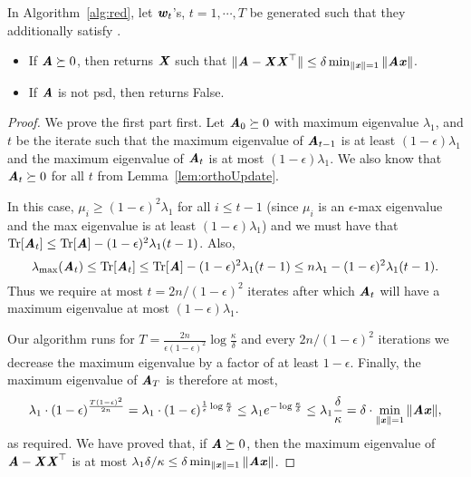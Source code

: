 \begin{lemma}\label{lem:RedAns}
In Algorithm~\ref{alg:red}, let $\ww_t$'s, $t=1,\cdots, T$ be generated such that they additionally satisfy . 
\begin{itemize}
    \item If $\AA\succeq 0$, then  returns $\XX$ such that $\|\AA-\XX\XX^{\top}\|\leq \delta \min_{\|\xx\|=1}\|\AA\xx\|$. 
    \item If $\AA$ is not psd, then  returns {\sc False}.
\end{itemize}
\end{lemma}
\begin{proof}
We prove the first part first. Let $\AA_0\succeq 0$ with maximum eigenvalue $\lambda_1$, and $t$ be the iterate such that the maximum eigenvalue of $\AA_{t-1}$ is at least $(1-\epsilon)\lambda_1$ and the maximum eigenvalue of $\AA_t$ is at most $(1-\epsilon)\lambda_1$. We also know that $\AA_t\succeq 0$ for all $t$ from Lemma~\ref{lem:orthoUpdate}.

In this case, $\mu_i \geq (1-\epsilon)^2\lambda_1$ for all $i\leq t-1$ (since $\mu_i$ is an $\epsilon$-max eigenvalue and the max eigenvalue is at least $(1-\epsilon)\lambda_1$) and we must have that $\Tr[\AA_t]\leq \Tr[\AA] - (1-\epsilon)^2\lambda_1(t-1)$. Also,
\[
\lambda_{\max}(\AA_t) \leq \Tr[\AA_t]\leq \Tr[\AA] - (1-\epsilon)^2\lambda_1(t-1) \leq  n\lambda_1 - (1-\epsilon)^2\lambda_1(t-1).
\]
Thus we require at most $t = 2n/(1-\epsilon)^2$ iterates after which $\AA_t$ will have a maximum eigenvalue at most $(1-\epsilon)\lambda_1$. 

Our algorithm runs for $T = \frac{2n}{\epsilon(1-\epsilon)^2}\log \frac{\kappa}{\delta}$ and every $2n/(1-\epsilon)^2$ iterations we decrease the maximum eigenvalue by a factor of at least $1-\epsilon$. Finally, the maximum eigenvalue of $\AA_T$ is therefore at most,
\[
\lambda_1 \cdot (1-\epsilon)^{\frac{T(1-\epsilon)^2}{2n}}=\lambda_1 \cdot (1-\epsilon)^{\frac{1}{\epsilon}\log \frac{\kappa}{\delta}} \leq \lambda_1 e^{-\log \frac{\kappa}{\delta}}\leq \lambda_1 \frac{\delta}{\kappa} = \delta \cdot \min_{\|\xx\|=1}\|\AA\xx\|, 
\] 
as required. We have proved that, if $\AA\succeq 0$, then the maximum eigenvalue of $\AA-\XX\XX^{\top}$ is at most $\lambda_1\delta/\kappa \leq \delta \min_{\|\xx\|=1}\|\AA\xx\|$.%


\end{proof}
